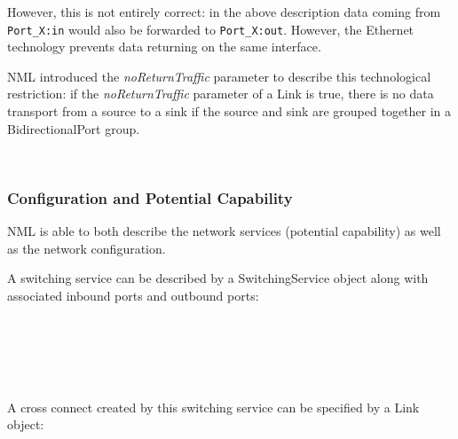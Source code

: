 However, this is not entirely correct: in the above description data coming from \texttt{Port\_X:in} would also be forwarded to \texttt{Port\_X:out}. However, the Ethernet technology prevents data returning on the same interface.

NML introduced the \emph{noReturnTraffic} parameter to describe this technological restriction: if the \emph{noReturnTraffic} parameter of a Link is true, there is no data transport from a source to a sink if the source and sink are grouped together in a BidirectionalPort group.

 \\


\subsubsection{Configuration and Potential Capability}

NML is able to both describe the network services (potential capability) as well as the network configuration.

A switching service can be described by a SwitchingService object along with associated inbound ports and outbound ports:

 \\
 \\
 \\
 \\

A cross connect created by this switching service can be specified by a Link object:

 \\
 \\
 \\
 \\


